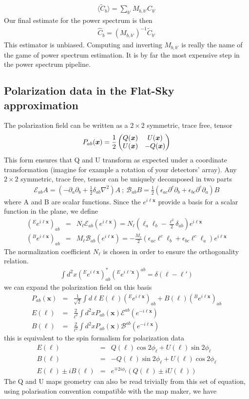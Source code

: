 \documentclass[a4paper, 11pt]{article}
\def\eop{\mathcal{E}}
\def\bop{\mathcal{B}}
\def\ba{\begin{eqnarray}}
\def\ea{\end{eqnarray}}
\begin{document}
\ba
\langle \tilde{C}_{b} \rangle= \sum_{b'} M_{b, b'}  C_{b'}
\ea 
Our final estimate for the power spectrum is then
\ba
\hat{C}_{b}= (M_{b, b'})^{-1} \tilde{C}_{b'} 
\ea
This estimator is unbiased. Computing and inverting $M_{b, b'}$ is really the name of the game of power spectrum estimation. It is by far the most expensive step in the power spectrum pipeline.

\subsection{Polarization data in the Flat-Sky approximation}

The polarization field can be written as  a $2\times2$ symmetric, trace free, tensor 
\ba
P_{ab}(\bm{x})= \frac{1}{2}
\begin{pmatrix} 
Q(\bm{x}) & 
U(\bm{x}) \cr
U(\bm{x}) & 
-Q(\bm{x}) \cr
\end{pmatrix} 
\ea
This form ensures that Q and U transform as expected under a coordinate transformation (imagine for example a rotation of your detectors' array).
Any $2\times2$ symmetric, trace free, tensor can be uniquely decomposed in two parts
\ba 
\eop_{ab} A=(-\partial_{a}\partial_{b}+ \frac{1}{2}\delta_{ab} \nabla^{2})A \ ; \ \bop_{ab}B=\frac{1}{2} (\epsilon_{ac}\partial^{c}\partial_{b} + \epsilon_{bc}\partial^{c}\partial_{a})B
\ea
where A and B are scalar functions. Since the $e^{i\bm{\ell} \bm{x}}$ provide a basis for a scalar function in the plane, we define
\ba
(^{E}e^{i\bm{\ell}\bm{x}})_{ab} &=& N_{\bm{\ell}} \eop_{ab} (e^{i\bm{\ell}\bm{x}})= N_{\bm{\ell}} ( \ell_{a}\ell_{b}- \frac{\bm{\ell}^{2}}{2}\delta_{ab})e^{i\bm{\ell}\bm{x}} \\
(^{B}e^{i\bm{\ell}\bm{x}})_{ab} &=& M_{\bm{\ell}}\bop_{ab} (e^{i\bm{\ell}\bm{x}})=- \frac{M_{\bm{\ell}}}{2} (\epsilon_{ac}\ell^{c}\ell_{b} + \epsilon_{bc}\ell^{c}\ell_{a}) e^{i\bm{\ell}\bm{x}}
\ea
The normalization coefficient $N_{\bm{\ell}}$ is chosen in order to ensure the orthogonality relation.
\ba
\int d^{2}x (^{E}e^{i\bm{\ell}\bm{x}})^{*}_{ab} (^{E}e^{i\bm{\ell}'\bm{x}})^ {ab} = \delta( \bm{\ell}-\bm{\ell}')
\ea
we can expand the polarization field on this basis
\ba
P_{ab}(\bm{x}) &=& \frac{1}{\sqrt{2}} \int d\bm{\ell} E(\bm{\ell}) (^{E}e^{i\bm{\ell}\bm{x}})_{ab} +B({\bm{\ell}}) (^{B}e^{i\bm{\ell}\bm{x}})_{ab} \\
 E({\bm{\ell}}) &=& \frac{2}{\ell^{2}} \int d^{2}x   P_{ab}(\bm{x})   \eop^{ab}(e^{-i\bm{\ell}\bm{x}}) \\
 B({\bm{\ell}}) &=& \frac{2}{\ell^{2}} \int d^{2}x   P_{ab}(\bm{x})  \bop^{ab}(e^{-i\bm{\ell}\bm{x}}) 
\ea
this is equivalent to the spin formalism for polarization data
\ba
E({\bm{\ell}}) &=& Q(\bm{\ell}) \cos 2\phi_{\bm{\ell}}+U(\bm{\ell})\sin 2\phi_{\bm{\ell}}   \\
B({\bm{\ell}}) &=& -Q(\bm{\ell})\sin 2\phi_{\bm{\ell}} +U(\bm{\ell}) \cos 2\phi_{\bm{\ell}}  \\
E({\bm{\ell}}) \pm i B({\bm{\ell}})&=& e^{\mp 2i\phi_{\bm{\ell}}}(Q(\bm{\ell}) \pm i U(\bm{\ell}))
\ea
The Q and U maps geometry can also be read trivially from this set of equation, using polarisation convention compatible with the map maker, we have
\end{document}
